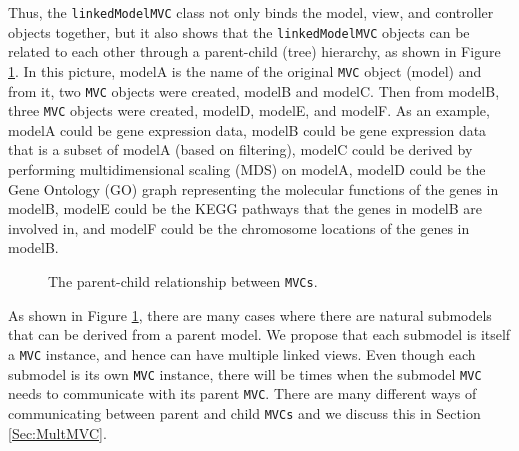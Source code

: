 \documentclass{article}[11pt]
\newcommand{\Robject}[1]{{\texttt{#1}}}
\newcommand{\Rclass}[1]{\texttt{#1}}
\begin{document}
Thus, the \Rclass{linkedModelMVC} class not only binds the model,
view, and controller objects together, but it also shows
that the \Robject{linkedModelMVC} objects can be related to each other 
through a parent-child (tree) hierarchy, as shown in Figure \ref{Fig:Hier}.
In this picture, modelA is the name of the original \Robject{MVC} object
(model) and from it, two \Robject{MVC} objects were created,
modelB and modelC. Then from modelB, three
\Robject{MVC} objects were created, modelD, modelE, and
modelF.  As an example, modelA could be gene 
expression data, modelB could be gene expression data that is a subset of
modelA (based on filtering), modelC could be derived by performing
multidimensional scaling (MDS) on modelA, modelD could be the Gene Ontology
(GO) graph representing the molecular functions of the genes in modelB,
modelE could be the KEGG pathways that the genes in modelB are involved
in, and modelF could be the chromosome locations of the genes in modelB.

\begin{figure}[ht]
  \begin{center}
    \caption{ The parent-child relationship between \Robject{MVCs}. }
    \label{Fig:Hier}
  \end{center}
\end{figure}

As shown in Figure \ref{Fig:Hier}, there are many cases where there are
natural submodels that can be derived from a parent model.  We propose that
each submodel is itself a \Robject{MVC} instance, and hence can have multiple
linked views.  Even though each submodel is its own \Robject{MVC} instance,
there will be times when the submodel \Robject{MVC} needs to communicate with
its parent \Robject{MVC}.  There are many different ways of communicating
between parent and child \Robject{MVCs} and we discuss this in Section
\ref{Sec:MultMVC}.
\end{document}
